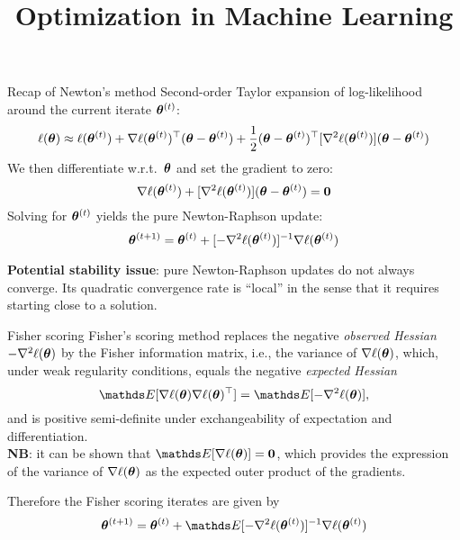 \documentclass[11pt,compress,t,notes=noshow, xcolor=table]{beamer}
\title{Optimization in Machine Learning}
\begin{document}

\begin{vbframe}{Recap of Newton's method}
Second-order Taylor expansion of log-likelihood around the current iterate $\bm{\theta}^{(t)}$:
$$\ell(\bm{\theta}) \approx \ell(\bm{\theta}^{(t)}) +
\nabla\ell(\bm{\theta}^{(t)})^\top(\bm{\theta}-\bm{\theta}^{(t)}) + 
\frac{1}{2}(\bm{\theta}-\bm{\theta}^{(t)})^\top[\nabla^{2}\ell(\bm{\theta}^{(t)})](\bm{\theta}-\bm{\theta}^{(t)})$$
We then differentiate w.r.t.~$\bm{\theta}$ and set the gradient to zero:
$$\nabla\ell(\bm{\theta}^{(t)}) + [\nabla^{2}\ell(\bm{\theta}^{(t)})](\bm{\theta}-\bm{\theta}^{(t)}) = \mathbf{0}$$
Solving for $\bm{\theta}^{(t)}$ yields the pure Newton-Raphson update:
$$\bm{\theta}^{(t+1)}=\bm{\theta}^{(t)} + [-\nabla^{2}\ell(\bm{\theta}^{(t)})]^{-1}\nabla\ell(\bm{\theta}^{(t)})$$

\lz

\textbf{Potential stability issue}: pure Newton-Raphson updates do not always converge. Its quadratic convergence rate is ``local'' in the sense that it requires starting close to a solution.  %
\end{vbframe}

\begin{vbframe}{Fisher scoring}
Fisher’s scoring method replaces the negative \textit{observed Hessian} $-\nabla^{2}\ell(\bm{\theta})$ 
by the Fisher information matrix, i.e., the variance of $\nabla \ell(\bm{\theta})$, which, under weak regularity conditions, equals the negative \textit{expected Hessian}
$$\E[\nabla\loglt\nabla\loglt^\top]=\E[-\nabla^{2}\loglt],$$
and is positive semi-definite under exchangeability of expectation and differentiation.\\

\textbf{NB}: it can be shown that $\E[\nabla \ell(\thetav)]=\mathbf{0}$, which provides the expression of the variance of $\nabla \ell(\bm{\theta})$ as the expected outer product of the gradients.

\lz

Therefore the Fisher scoring iterates are given by
$$\thetav^{(t+1)}=\thetav^{(t)}+\E[-\nabla^{2}\logl(\thetav^{(t)})]^{-1}\nabla\logl(\thetav^{(t)})$$
\end{vbframe}
\end{document}
